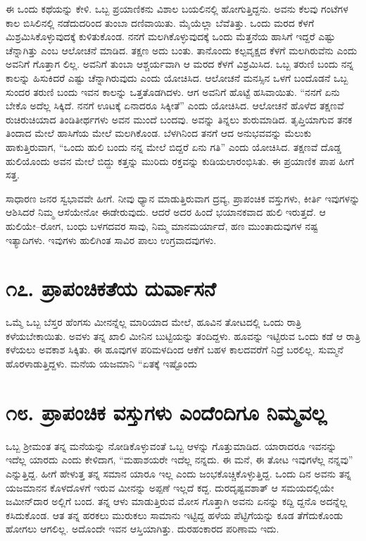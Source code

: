 ಈ ಒಂದು ಕಥೆಯನ್ನು ಕೇಳಿ. ಒಬ್ಬ ಪ್ರಯಾಣಿಕನು ವಿಶಾಲ ಬಯಲಿನಲ್ಲಿ ಹೋಗುತ್ತಿದ್ದನು. ಅವನು ಕೆಲವು ಗಂಟೆಗಳ ಕಾಲ ಬಿಸಿಲಿನಲ್ಲಿ ನಡೆದುದರಿಂದ ತುಂಬಾ ದಣಿವಾಯಿತು. ಮೈಯೆಲ್ಲಾ ಬೆವೆತಿತ್ತು. ಒಂದು ಮರದ ಕೆಳಗೆ ಮಿಶ್ರಮಿಸಿಕೊಳ್ಳುವುದಕ್ಕೆ ಕುಳಿತುಕೊಂಡ. ನನಗೆ ಮಲಗಿಕೊಳ್ಳುವುದಕ್ಕೆ ಒಂದು ಮೆತ್ತನೆಯ ಹಾಸಿಗೆ ಇದ್ದರೆ ಎಷ್ಟು ಚೆನ್ನಾಗಿತ್ತು ಎಂಬ ಆಲೋಚನೆ ಮಾಡಿದ. ತಕ್ಷಣ ಅದು ಬಂತು. ತಾನೊಂದು ಕಲ್ಪವೃಕ್ಷದ ಕೆಳಗೆ ಮಲಗಿರುವೆನು ಎಂದು ಅವನಿಗೆ ಗೊತ್ತಾಗ ಲಿಲ್ಲ. ಅವನಿಗೆ ತುಂಬಾ ಆಶ್ಚರ್ಯವಾಗಿ ಆ ಮರದ ಕೆಳಗೆ ವಿಶ್ರಮಿಸಿದ. ಒಬ್ಬ ತರುಣಿ ಬಂದು ನನ್ನ ಕಾಲನ್ನು ಹಿಸುಕಿದರೆ ಎಷ್ಟು ಚೆನ್ನಾಗಿರುವುದು ಎಂದು ಯೋಚಿಸಿದ. ಆಲೋಚನೆ ಮನಸ್ಸಿನ ಒಳಗೆ ಬಂದೊಡನೆ ಒಬ್ಬ ಸುಂದರ ತರುಣಿ ಬಂದು ಇವನ ಕಾಲನ್ನು ಒತ್ತತೊಡಗಿದಳು. ಆಗ ಅವನಿಗೆ ಹೊಟ್ಟೆ ಹಸಿವಾಯಿತು. “ನನಗೆ ಏನು ಬೇಕೊ ಅದೆಲ್ಲ ಸಿಕ್ಕಿದೆ. ನನಗೆ ಊಟಕ್ಕೆ ಏನಾದರೂ ಸಿಕ್ಕೀತೆ” ಎಂದು ಯೋಚಿಸಿದ. ಆಲೋಚನೆ ಹೊಳೆದ ತಕ್ಷಣವೆ ರುಚಿರುಚಿಯಾದ ತಿಂಡಿತೀರ್ಥಗಳು ಅವನ ಮುಂದೆ ಬಂದವು. ಅವನ್ನು ತಿನ್ನಲು ಶುರುಮಾಡಿದ. ತೃಪ್ತಿಯಾಗುವ ತನಕ ತಿಂದಾದ ಮೇಲೆ ಹಾಸಿಗೆಯ ಮೇಲೆ ಮಲಗಿಕೊಂಡ. ಬೆಳಗಿನಿಂದ ತನಗೆ ಆದ ಅನುಭವವನ್ನು ಮೆಲುಕು ಹಾಕುತ್ತಿರುವಾಗ, “ಒಂದು ಹುಲಿ ಬಂದು ನನ್ನ ಮೇಲೆ ಬಿದ್ದರೆ ಏನು ಗತಿ” ಎಂದು ಯೋಚಿಸಿದ. ತಕ್ಷಣವೆ ದೊಡ್ಡ ಹುಲಿಯೊಂದು ಅವನ ಮೇಲೆ ಬಿದ್ದು ಕತ್ತನ್ನು ಮುರಿದು ರಕ್ತವನ್ನು ಕುಡಿಯಲಾರಂಭಿಸಿತು. ಈ ಪ್ರಯಾಣಿಕ ಪಾಪ ಹೀಗೆ ಸತ್ತ.

ಸಾಧಾರಣ ಜನರ ಸ್ವಭಾವವೇ ಹೀಗೆ. ನೀವು ಧ್ಯಾನ ಮಾಡುತ್ತಿರುವಾಗ ದ್ರವ್ಯ, ಪ್ರಾಪಂಚಿಕ ವಸ್ತುಗಳು, ಕೀರ್ತಿ ಇವುಗಳನ್ನು ಆಶಿಸಿದರೆ ನಿಮ್ಮ ಆಸೆಯೇನೋ ಈಡೇರುವುದು. ಆದರೆ ಅದರ ಹಿಂದೆ ಭಯಾನಕವಾದ ಹುಲಿ ಇರುತ್ತದೆ. ಆ ಹುಲಿಯೇ–ರೋಗ, ಬಂಧು ಬಳಗದವರ ಸಾವು, ನಿಮ್ಮ ಮಾನಮರ್ಯಾದೆ, ಹಣ ಮುಂತಾದುವುಗಳ ನಷ್ಟ ಇತ್ಯಾದಿಗಳು. ಇವುಗಳು ಹುಲಿಗಿಂತ ಸಾವಿರ ಪಾಲು ಉಗ್ರವಾದವುಗಳು.


\section{\num{೧೭.} ಪ್ರಾಪಂಚಿಕತೆಯ ದುರ್ವಾಸನೆ}

ಒಮ್ಮೆ ಒಬ್ಬ ಬೆಸ್ತರ ಹೆಂಗಸು ಮೀನನ್ನೆಲ್ಲ ಮಾರಿಯಾದ ಮೇಲೆ, ಹೂವಿನ ತೋಟದಲ್ಲಿ ಒಂದು ರಾತ್ರಿ ಕಳೆಯಬೇಕಾಯಿತು. ಅವಳು ತನ್ನ ಖಾಲಿ ಮೀನಿನ ಬುಟ್ಟಿಯನ್ನು ತಂದಿದ್ದಳು. ಹೂವನ್ನು ಇಟ್ಟಿರುವ ಒಂದು ಕಡೆ ಆ ರಾತ್ರಿ ಕಳೆಯಲು ಅವಕಾಶ ಸಿಕ್ಕಿತು. ಈ ಹೂವುಗಳ ಪರಿಮಳದಿಂದ ಆಕೆಗೆ ಬಹಳ ಕಾಲದವರೆಗೆ ನಿದ್ರೆ ಬರಲಿಲ್ಲ. ಸುಮ್ಮನೆ ಹೊರಳಾಡುತ್ತಿದ್ದಳು. ಮನೆಯ ಯಜಮಾನಿ “ಏತಕ್ಕೆ ಇಷ್ಟೊಂದು



\section{\num{೧೮.} ಪ್ರಾಪಂಚಿಕ ವಸ್ತುಗಳು ಎಂದೆಂದಿಗೂ ನಿಮ್ಮವಲ್ಲ}

ಒಬ್ಬ ಶ್ರೀಮಂತ ತನ್ನ ಮನೆಯನ್ನು ನೋಡಿಕೊಳ್ಳುವಂತೆ ಒಬ್ಬ ಆಳನ್ನು ಗೊತ್ತುಮಾಡಿದ. ಯಾರಾದರೂ ಇವನನ್ನು ಇದೆಲ್ಲ ಯಾರದು ಎಂದು ಕೇಳಿದಾಗ, “ಮಹಾಶಯರೇ ಇದೆಲ್ಲ ನನ್ನದು. ಈ ಮನೆ, ಈ ತೋಟ ಇವುಗಳೆಲ್ಲ ನನ್ನವು” ಎನ್ನುತ್ತಿದ್ದ. ಹೀಗೆ ಹೇಳುತ್ತ ತನ್ನ ಸಮಾನ ಯಾರೂ ಇಲ್ಲ ಎಂದು ಜಂಭಕೊಚ್ಚಿಕೊಳ್ಳುತ್ತಿದ್ದ. ಒಂದು ದಿನ ಅವನು ತನ್ನ ಯಜಮಾನನ ಕೊಳದೊಳಗೆ ಇರುವ ಮೀನನ್ನು ಅಪ್ಪಣೆ ಇಲ್ಲದೆ ಕದ್ದ. ದುರದೃಷ್ಟವಶಾತ್ ಆ ಸಮಯದಲ್ಲಿಯೇ ಜಮೀನ್​ದಾರ ಅಲ್ಲಿಗೆ ಬಂದ. ತನ್ನ ಆಳು ಮಾಡುತ್ತಿರುವ ಮೋಸ ಗೊತ್ತಾಗಿ ಅವನು ಏನನ್ನು ಕದ್ದಿ ದ್ದನೊ ಅದನ್ನೆಲ್ಲ ಕಸಿದುಕೊಂಡ. ಆತ ತನ್ನ ಹರಕಲು ಮುರುಕಲು ಸಾಮಾನು ಇಟ್ಟಿದ್ದ ಹಳೆಯ ಪೆಟ್ಟಿಗೆಯನ್ನು ಕೂಡ ತೆಗೆದುಕೊಂಡು ಹೋಗಲು ಆಗಲಿಲ್ಲ. ಅದೊಂದೇ ಇವನ ಆಸ್ತಿಯಾಗಿತ್ತು. ದುರಹಂಕಾರದ ಪರಿಣಾಮ ಇದು.


